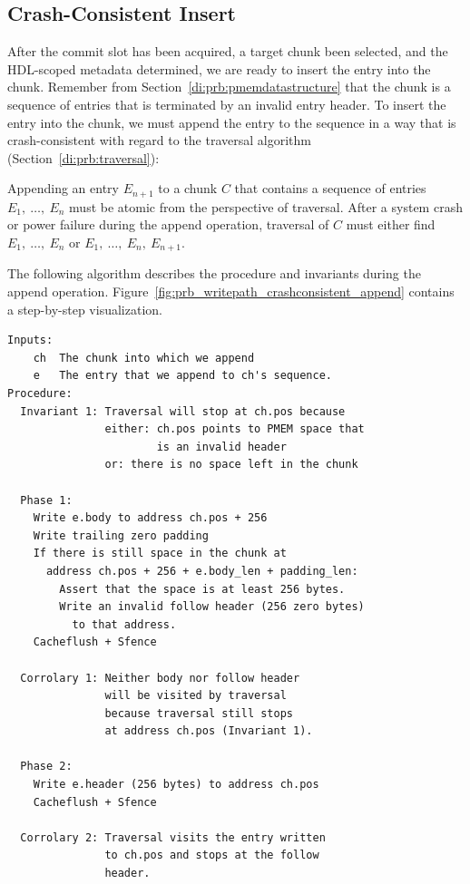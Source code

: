 \documentclass[12pt,a4paper,twoside]{book}
\begin{document}
\subsection{Crash-Consistent Insert}\label{di:prb:write:crashconsistency}
After the commit slot has been acquired, a target chunk been selected, and the HDL-scoped metadata determined, we are ready to insert the entry into the chunk.
Remember from Section~\ref{di:prb:pmemdatastructure} that the chunk is a sequence of entries that is terminated by an invalid entry header.
To insert the entry into the chunk, we must append the entry to the sequence in a way that is crash-consistent with regard to the traversal algorithm (Section~\ref{di:prb:traversal}):
\begin{displayquote}
    Appending an entry $E_{n+1}$ to a chunk $C$ that contains a sequence of entries $E_1,~\dots,~E_n$ must be atomic from the perspective of traversal.
    After a system crash or power failure during the append operation, traversal of $C$ must either find $E_1,~\dots,~E_n$ or $E_1,~\dots,~E_n,~E_{n+1}$.
\end{displayquote}
The following algorithm describes the procedure and invariants during the append operation.
Figure~\ref{fig:prb_writepath_crashconsistent_append} contains a step-by-step visualization.
\begin{lstlisting}[style=figurepseudocode]
Inputs:
    ch  The chunk into which we append
    e   The entry that we append to ch's sequence.
Procedure:
  Invariant 1: Traversal will stop at ch.pos because
               either: ch.pos points to PMEM space that
                       is an invalid header
               or: there is no space left in the chunk

  Phase 1:
    Write e.body to address ch.pos + 256
    Write trailing zero padding
    If there is still space in the chunk at
      address ch.pos + 256 + e.body_len + padding_len:
        Assert that the space is at least 256 bytes.
        Write an invalid follow header (256 zero bytes)
          to that address.
    Cacheflush + Sfence

  Corrolary 1: Neither body nor follow header
               will be visited by traversal
               because traversal still stops
               at address ch.pos (Invariant 1).

  Phase 2:
    Write e.header (256 bytes) to address ch.pos
    Cacheflush + Sfence

  Corrolary 2: Traversal visits the entry written
               to ch.pos and stops at the follow
               header.
\end{lstlisting}
\end{document}
